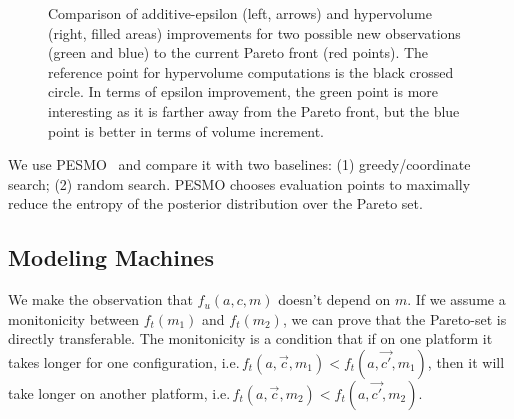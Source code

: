 \begin{figure}
\begin{subfigure}{0.45\textwidth}
  \end{subfigure}
  \caption{Comparison of additive-epsilon (left, arrows) and hypervolume (right,
    filled areas) improvements for two possible new observations (green and
    blue) to the current Pareto front (red points). The reference point for
    hypervolume computations is the black crossed circle.  In terms of epsilon
    improvement, the green point is more interesting as it is farther away from
    the Pareto front, but the blue point is better in terms of volume
    increment.}
\end{figure}

We use PESMO~\cite{hernandez2016predictive} and compare it with two baselines:
(1) greedy/coordinate search; (2) random search. PESMO chooses evaluation points
to maximally reduce the entropy of the posterior distribution over the Pareto
set.


\subsection{Modeling Machines}
\label{sec:performance-transfer}

We make the observation that $f_u(a, c, m)$ doesn't depend on $m$. If we assume
a monitonicity between $f_t(m_1)$ and $f_t(m_2)$, we can prove that the
Pareto-set is directly transferable. The monitonicity is a condition that if on
one platform it takes longer for one configuration,
i.e.\,$f_t(a, \vec{c}, m_1) < f_t(a, \vec{c'}, m_1)$, then it will take longer
on another platform, i.e.\,$f_t(a, \vec{c}, m_2) < f_t(a, \vec{c'}, m_2)$.

